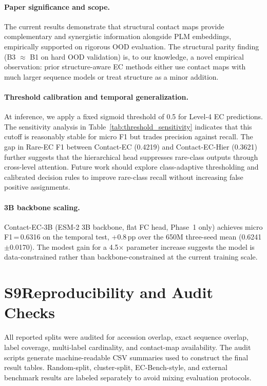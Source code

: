 \documentclass[11pt,a4paper]{article}
\begin{document}
\paragraph{Paper significance and scope.}
The current results demonstrate that structural contact maps provide complementary
and synergistic information alongside PLM embeddings, empirically supported on
rigorous OOD evaluation. The structural parity finding (B3 $\approx$ B1 on
hard OOD validation) is, to our knowledge, a novel empirical observation: prior
structure-aware EC methods either use contact maps with much larger sequence
models or treat structure as a minor addition.

\paragraph{Threshold calibration and temporal generalization.}
At inference, we apply a fixed sigmoid threshold of 0.5 for Level-4 EC predictions.
The sensitivity analysis in Table~\ref{tab:threshold_sensitivity} indicates that
this cutoff is reasonably stable for micro F1 but trades precision against recall.
The gap in Rare-EC F1 between Contact-EC (0.4219) and Contact-EC-Hier (0.3621)
further suggests that the hierarchical head suppresses rare-class outputs through
cross-level attention. Future work should explore class-adaptive thresholding and
calibrated decision rules to improve rare-class recall without increasing false
positive assignments.

\paragraph{3B backbone scaling.}
Contact-EC-3B (ESM-2 3B backbone, flat FC head, Phase~1 only) achieves micro
F1\,=\,0.6316 on the temporal test, +0.8\,pp over the 650M three-seed mean
(0.6241$\pm$0.0170). The modest gain for a 4.5$\times$ parameter increase
suggests the model is data-constrained rather than backbone-constrained at
the current training scale.

\section*{S9\quad Reproducibility and Audit Checks}

All reported splits were audited for accession overlap, exact sequence overlap,
label coverage, multi-label cardinality, and contact-map availability. The audit
scripts generate machine-readable CSV summaries used to construct the final result
tables. Random-split, cluster-split, EC-Bench-style, and external benchmark results
are labeled separately to avoid mixing evaluation protocols.
\end{document}
